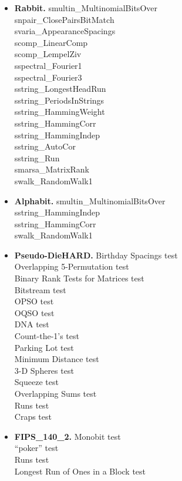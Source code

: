 \begin{itemize}
\item{\textbf{Rabbit.}} smultin\_MultinomialBitsOver\\ 
snpair\_ClosePairsBitMatch\\ 
svaria\_AppearanceSpacings\\ 
scomp\_LinearComp\\ 
scomp\_LempelZiv\\ 
sspectral\_Fourier1\\ 
sspectral\_Fourier3\\ 
sstring\_LongestHeadRun\\ 
sstring\_PeriodsInStrings\\ 
sstring\_HammingWeight\\ 
sstring\_HammingCorr\\ 
sstring\_HammingIndep\\ 
sstring\_AutoCor\\ 
sstring\_Run\\ 
smarsa\_MatrixRank\\ 
swalk\_RandomWalk1\\ 

\item{\textbf{Alphabit.}} smultin\_MultinomialBitsOver\\ 
sstring\_HammingIndep\\ 
sstring\_HammingCorr\\ 
swalk\_RandomWalk1 \\ 


\item{\textbf{Pseudo-DieHARD.}} Birthday Spacings test\\ 
Overlapping 5-Permutation test\\ 
Binary Rank Tests for Matrices test\\ 
Bitstream test\\ 
OPSO test\\ 
OQSO test\\ 
DNA test\\ 
Count-the-1's test\\ 
Parking Lot test\\ 
Minimum Distance test\\ 
3-D Spheres test\\ 
Squeeze test\\ 
Overlapping Sums test\\ 
Runs test\\ 
Craps test\\ 

\item{\textbf{FIPS\_140\_2.}} Monobit test\\ 
``poker'' test\\ 
Runs test\\ 
Longest Run of Ones in a Block test

\end{itemize}

